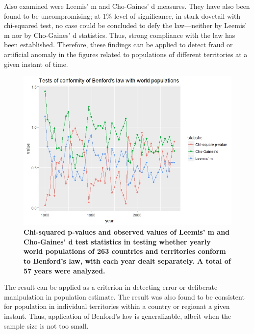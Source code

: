 Also examined were Leemis’ m and Cho-Gaines’ d measures. They have also been found to be uncompromising; at 1\% level of significance, in stark dovetail with chi-squared test, no case could be concluded to defy the law—neither by Leemis’ m nor by Cho-Gaines’  d statistics. Thus, strong compliance with the law has been established. Therefore, these findings can be applied to detect fraud or artificial anomaly in the figures related to populations of different territories at a given instant of time. 

\begin{figure}[h]
  \centering
  \includegraphics[width=\textwidth]{ben_test_pop}
  \caption{\textbf {Chi-squared p-values and observed values of Leemis’ m and Cho-Gaines’ d test statistics in testing whether yearly world populations of 263 countries and territories conform to Benford’s law, with each year dealt separately. A total of 57 years were analyzed.}}
  \label{ben_test_pop}
\end{figure}

The result can be applied as a criterion in detecting error or deliberate manipulation in population estimate. The result was also found to be consistent for population in individual territories within a country or regionat a given instant. Thus, application of Benford's law is generalizable, albeit when the sample size is not too small. 

